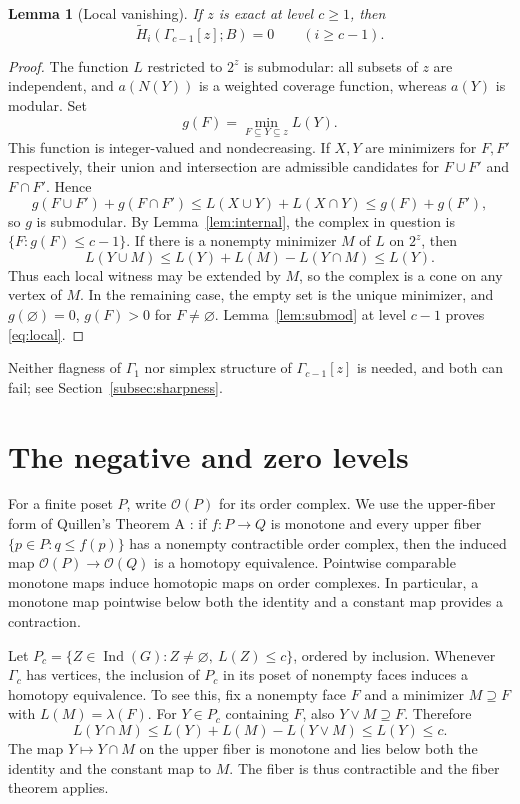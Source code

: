 \documentclass[11pt,a4paper]{article}
\newtheorem{lemma}[theorem]{Lemma}
\theoremstyle{definition}
\newcommand{\Ind}{\operatorname{Ind}}
\newcommand{\Ht}{\widetilde H}
\newcommand{\G}{\Gamma}
\begin{document}
\begin{lemma}[Local vanishing]\label{lem:local}
If $z$ is exact at level $c\geq1$, then
\begin{equation}\label{eq:local}
 \Ht_i(\G_{c-1}[z];B)=0\qquad(i\geq c-1).
\end{equation}
\end{lemma}
\begin{proof}
The function $L$ restricted to $2^z$ is submodular: all subsets of $z$ are independent, and $a(N(Y))$ is a weighted coverage function, whereas $a(Y)$ is modular. Set
\[
 g(F)=\min_{F\subseteq Y\subseteq z} L(Y).
\]
This function is integer-valued and nondecreasing. If $X,Y$ are minimizers for $F,F'$ respectively, their union and intersection are admissible candidates for $F\cup F'$ and $F\cap F'$. Hence
\[
 g(F\cup F')+g(F\cap F')\leq L(X\cup Y)+L(X\cap Y)\leq g(F)+g(F'),
\]
so $g$ is submodular. By Lemma~\ref{lem:internal}, the complex in question is $\{F:g(F)\leq c-1\}$. If there is a nonempty minimizer $M$ of $L$ on $2^z$, then
\[
 L(Y\cup M)\leq L(Y)+L(M)-L(Y\cap M)\leq L(Y).
\]
Thus each local witness may be extended by $M$, so the complex is a cone on any vertex of $M$. In the remaining case, the empty set is the unique minimizer, and $g(\varnothing)=0$, $g(F)>0$ for $F\ne\varnothing$. Lemma~\ref{lem:submod} at level $c-1$ proves \eqref{eq:local}.
\end{proof}
Neither flagness of $\G_1$ nor simplex structure of $\G_{c-1}[z]$ is needed, and both can fail; see Section~\ref{subsec:sharpness}.

\section{The negative and zero levels}\label{sec:base}
For a finite poset $P$, write $\mathcal O(P)$ for its order complex. We use the upper-fiber form of Quillen's Theorem A \cite[Proposition 1.6]{Quillen}: if $f:P\to Q$ is monotone and every upper fiber $\{p\in P:q\leq f(p)\}$ has a nonempty contractible order complex, then the induced map $\mathcal O(P)\to\mathcal O(Q)$ is a homotopy equivalence. Pointwise comparable monotone maps induce homotopic maps on order complexes. In particular, a monotone map pointwise below both the identity and a constant map provides a contraction.

Let $P_c=\{Z\in\Ind(G):Z\ne\varnothing,\ L(Z)\leq c\}$, ordered by inclusion. Whenever $\G_c$ has vertices, the inclusion of $P_c$ in its poset of nonempty faces induces a homotopy equivalence. To see this, fix a nonempty face $F$ and a minimizer $M\supseteq F$ with $L(M)=\lambda(F)$. For $Y\in P_c$ containing $F$, also $Y\vee M\supseteq F$. Therefore
\[
 L(Y\cap M)\leq L(Y)+L(M)-L(Y\vee M)\leq L(Y)\leq c.
\]
The map $Y\mapsto Y\cap M$ on the upper fiber is monotone and lies below both the identity and the constant map to $M$. The fiber is thus contractible and the fiber theorem applies.
\end{document}
